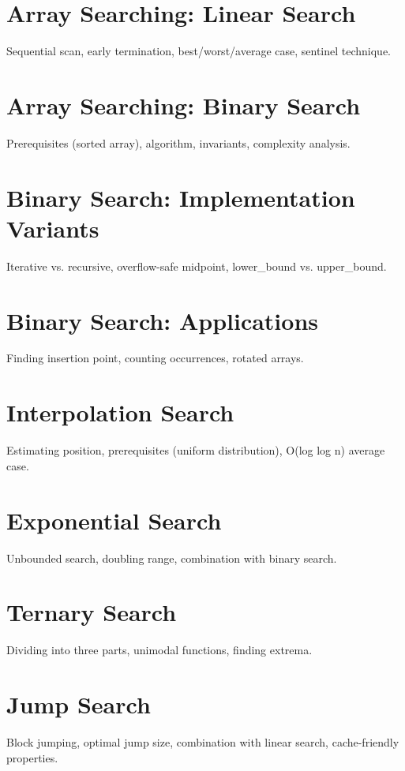 
\chapter{Array Searching: Linear Search}
Sequential scan, early termination, best/worst/average case, sentinel technique.

\chapter{Array Searching: Binary Search}
Prerequisites (sorted array), algorithm, invariants, complexity analysis.

\chapter{Binary Search: Implementation Variants}
Iterative vs. recursive, overflow-safe midpoint, lower\_bound vs. upper\_bound.

\chapter{Binary Search: Applications}
Finding insertion point, counting occurrences, rotated arrays.

\chapter{Interpolation Search}
Estimating position, prerequisites (uniform distribution), O(log log n) average case.

\chapter{Exponential Search}
Unbounded search, doubling range, combination with binary search.

\chapter{Ternary Search}
Dividing into three parts, unimodal functions, finding extrema.

\chapter{Jump Search}
Block jumping, optimal jump size, combination with linear search, cache-friendly properties.

